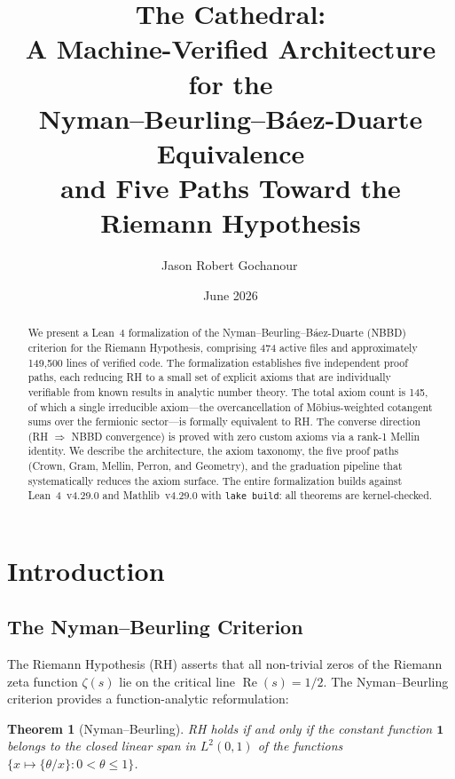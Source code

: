 \documentclass[11pt,a4paper]{article}
\title{%
  The Cathedral:\\
  A Machine-Verified Architecture for the\\
  Nyman--Beurling--B\'aez-Duarte Equivalence\\
  and Five Paths Toward the Riemann Hypothesis%
}
\author{
  Jason Robert Gochanour\,\orcidlink{0000-0002-2862-526X}
}
\date{June 2026}
\newtheorem{theorem}{Theorem}[section]
\theoremstyle{definition}
\newcommand{\lean}[1]{\texttt{#1}}
\newcommand{\re}{\operatorname{Re}}
\newcommand{\fract}[1]{\{#1\}}
\begin{document}
\maketitle

\begin{abstract}
We present a Lean~4 formalization of the Nyman--Beurling--B\'aez-Duarte
(NBBD) criterion for the Riemann Hypothesis, comprising 474 active files
and approximately 149,500 lines of verified code. The formalization
establishes five independent proof paths, each reducing RH to a small
set of explicit axioms that are individually verifiable from known results
in analytic number theory. The total axiom count is 145, of which
a single irreducible axiom---the overcancellation of M\"obius-weighted
cotangent sums over the fermionic sector---is formally equivalent to RH.
The converse direction (RH $\Rightarrow$ NBBD convergence) is proved
with zero custom axioms via a rank-1 Mellin identity. We describe the
architecture, the axiom taxonomy, the five proof paths (Crown, Gram,
Mellin, Perron, and Geometry), and the graduation pipeline that
systematically reduces the axiom surface. The entire formalization
builds against Lean~4~v4.29.0 and Mathlib~v4.29.0 with
\lean{lake build}: all theorems are kernel-checked.
\end{abstract}

\tableofcontents

\section{Introduction}
\label{sec:intro}

\subsection{The Nyman--Beurling Criterion}

The Riemann Hypothesis (RH) asserts that all non-trivial zeros of the
Riemann zeta function $\zeta(s)$ lie on the critical line
$\re(s) = 1/2$. The Nyman--Beurling criterion \cite{nyman1950,beurling1955}
provides a function-analytic reformulation:

\begin{theorem}[Nyman--Beurling]\label{thm:nb}
RH holds if and only if the constant function $\mathbf{1}$ belongs to
the closed linear span in $L^2(0,1)$ of the functions
$\{ x \mapsto \fract{\theta/x} : 0 < \theta \leq 1 \}$.
\end{theorem}
\end{document}
